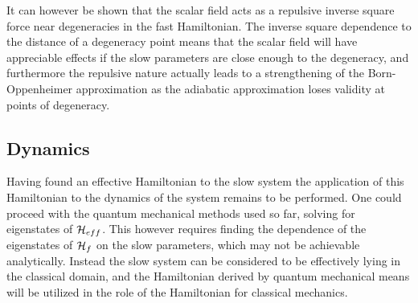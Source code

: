 \documentclass[a4paper]{article}
\begin{document}
It can however be shown that the scalar field acts as a repulsive inverse
square force near degeneracies in the fast Hamiltonian\cite{berrylim}. The inverse square dependence to
the distance of a degeneracy point means that the scalar field will have appreciable
effects if the slow parameters are close enough to the degeneracy, and furthermore the
repulsive nature actually leads to a strengthening of the Born-Oppenheimer approximation as
the adiabatic approximation loses validity at points of degeneracy.
\subsection{Dynamics}
Having found an effective Hamiltonian to the slow system the application of this
Hamiltonian to the dynamics of the system remains to be performed. One could proceed with
the quantum mechanical methods used so far, solving for eigenstates of \(\mathbb{\cal
H}_{eff}\). This however requires finding the dependence of the eigenstates of
\(\mathbb{\cal H}_f\) on the slow parameters, which may not be achievable analytically.
Instead the slow system can be considered to be effectively lying in the classical domain,
and the Hamiltonian derived by quantum mechanical means will be utilized in the role of the
Hamiltonian for classical mechanics. %
\end{document}
